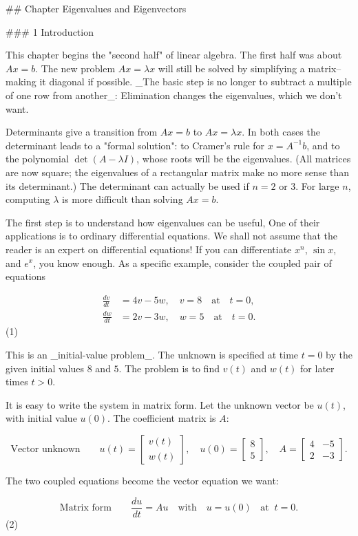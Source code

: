 

## Chapter Eigenvalues and Eigenvectors

### 1 Introduction

This chapter begins the "second half" of linear algebra. The first half was about \(Ax=b\). The new problem \(Ax=\lambda x\) will still be solved by simplifying a matrix--making it diagonal if possible. _The basic step is no longer to subtract a multiple of one row from another_: Elimination changes the eigenvalues, which we don't want.

Determinants give a transition from \(Ax=b\) to \(Ax=\lambda x\). In both cases the determinant leads to a "formal solution": to Cramer's rule for \(x=A^{-1}b\), and to the polynomial \(\det(A-\lambda I)\), whose roots will be the eigenvalues. (All matrices are now square; the eigenvalues of a rectangular matrix make no more sense than its determinant.) The determinant can actually be used if \(n=2\) or \(3\). For large \(n\), computing \(\lambda\) is more difficult than solving \(Ax=b\).

The first step is to understand how eigenvalues can be useful, One of their applications is to ordinary differential equations. We shall not assume that the reader is an expert on differential equations! If you can differentiate \(x^{n}\), \(\sin x\), and \(e^{x}\), you know enough. As a specific example, consider the coupled pair of equations

\[\begin{split}\frac{dv}{dt}&=4v-5w,\quad v=8\quad \text{at}\quad t=0,\\ \frac{dw}{dt}&=2v-3w,\quad w=5\quad\text{at}\quad t =0.\end{split}\] (1)

This is an _initial-value problem_. The unknown is specified at time \(t=0\) by the given initial values \(8\) and \(5\). The problem is to find \(v(t)\) and \(w(t)\) for later times \(t>0\).

It is easy to write the system in matrix form. Let the unknown vector be \(u(t)\), with initial value \(u(0)\). The coefficient matrix is \(A\):

\[\text{Vector unknown}\qquad u(t)=\begin{bmatrix}v(t)\\ w(t)\end{bmatrix},\quad u(0)=\begin{bmatrix}8\\ 5\end{bmatrix},\quad A=\begin{bmatrix}4&-5\\ 2&-3\end{bmatrix}.\]

The two coupled equations become the vector equation we want:

\[\text{Matrix form}\qquad\frac{du}{dt}=Au\quad\text{with}\quad u=u(0)\;\;\text{ at}\;\;t=0.\] (2)